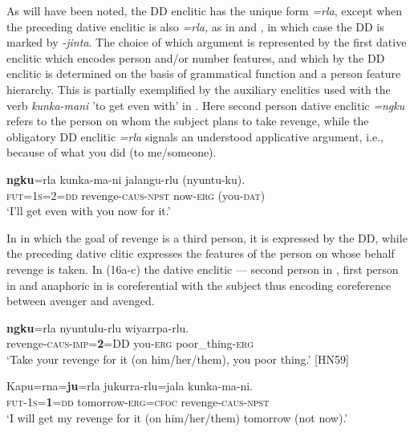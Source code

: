 \documentclass[output=paper]{../langscibook}
\begin{document}
\z


As will have been noted, the DD enclitic has the unique form \-\textit{=rla}, except when the preceding dative enclitic is also \textit{=rla,} as in  and , in which case the DD is marked by \textit{{}-jinta}. The choice of which argument is represented by the first dative enclitic which encodes person and/or number features, and which by the DD enclitic is determined on the basis of grammatical function and a person feature hierarchy. This is partially exemplified by the auxiliary enclitics used with the verb \textit{kunka-mani} 'to get even with' in . Here second person dative enclitic \textit{=ngku} refers to the person on whom the subject plans to take revenge, while the obligatory DD enclitic \textit{=rla} signals an understood applicative argument, i.e., because of what you did (to me/someone).

\ea%
    \label{ex:laughren:15}
\textbf{ngku}=rla  kunka-ma-ni  jalangu-rlu  ({nyuntu-ku}).\\
    \textsc{fut=1s=2=dd}  revenge-\textsc{caus-npst}  now-\textsc{erg}  (you-\textsc{dat)}\\
\glt `I'll get even with you now for it.'
\z


In  in which the goal of revenge is a third person, it is expressed by the DD, while the preceding dative clitic expresses the features of the person on whose behalf revenge is taken. In (16a-c) the dative enclitic — second person in , first person in  and anaphoric in  is coreferential with the subject thus encoding coreference between avenger and avenged.

\ea%
    \label{ex:laughren:16}
\ea
\label{ex:laughren:16a}
\textbf{{ngku}}=rla  nyuntulu-rlu  wiyarrpa-rlu.\\
    revenge-\textsc{caus-imp=}\textbf{\textsc{2}}\textsc{=DD}  you-\textsc{erg}  poor\_thing-\textsc{erg}\\
  \glt `Take your revenge for it (on him/her/them), you poor thing.' [HN59]

\ex
\label{ex:laughren:16b}
\gll Kapu=rna=\textbf{{ju}}=rla  jukurra-rlu=jala  kunka-ma-ni.\\
    \textsc{fut-1s=}\textbf{\textsc{1}}\textsc{=dd}  tomorrow-\textsc{erg=cfoc}  revenge-\textsc{caus-npst}\\
\glt `I will get my revenge for it (on him/her/them) tomorrow (not now).'
\end{document}
